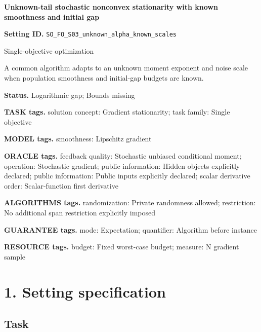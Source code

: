 \documentclass[10pt,a4paper]{article}
\begin{document}
\raggedright

{\LARGE\bfseries\sffamily\color{AtlasNavy} Unknown-tail stochastic nonconvex stationarity with known smoothness and initial gap\par}\vspace{5pt}


\textbf{Setting ID.} \texttt{SO\_\allowbreak{}FO\_\allowbreak{}S03\_\allowbreak{}unknown\_\allowbreak{}alpha\_\allowbreak{}known\_\allowbreak{}scales}



Single-objective optimization



A common algorithm adapts to an unknown moment exponent and noise scale when population smoothness and initial-gap budgets are known.



\textbf{Status.} Logarithmic gap; Bounds missing



\textbf{TASK tags.} solution concept: Gradient stationarity; task family: Single objective



\textbf{MODEL tags.} smoothness: Lipschitz gradient



\textbf{ORACLE tags.} feedback quality: Stochastic unbiased conditional moment; operation: Stochastic gradient; public information: Hidden objects explicitly declared; public information: Public inputs explicitly declared; scalar derivative order: Scalar-function first derivative



\textbf{ALGORITHMS tags.} randomization: Private randomness allowed; restriction: No additional span restriction explicitly imposed



\textbf{GUARANTEE tags.} mode: Expectation; quantifier: Algorithm before instance



\textbf{RESOURCE tags.} budget: Fixed worst-case budget; measure: N gradient sample



\section{1. Setting specification}


\subsection{Task}
\end{document}
